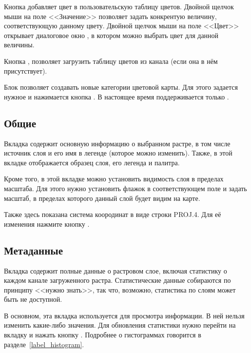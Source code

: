 Кнопка  добавляет цвет в пользовательскую таблицу
цветов. Двойной щелчок мыши на поле <<Значение>>
позволяет задать конкрентую величину, соответствующую данному цвету. Двойной щелчок
мыши на поле <<Цвет>> открывает диалоговое окно , в котором
можно выбрать цвет для данной величины.

Кнопка ,
позволяет загрузить таблицу цветов из канала (если она в нём присутствует).

Блок  позволяет создавать
новые категории цветовой карты. Для этого задается нужное
 и нажимается кнопка
. В настоящее время поддерживается только
.

\subsection{Общие}\label{label_generaltab}

Вкладка  содержит основную информацию о выбранном растре,
в том числе источник слоя и его имя в легенде (которое можно изменить).
Также, в этой вкладке отображается образец слоя, его легенда и палитра.

Кроме того, в этой вкладке можно установить видимость слоя в пределах
масштаба. Для этого нужно установить флажок в соответствующем поле и
задать масштаб, в пределах которого данный слой будет видим на
карте.

Также здесь показана система коородинат в виде строки PROJ.4. Для её изменения
нажмите кнопку .

\subsection{Метаданные}\label{label_metatab}

Вкладка  содержит полные данные о растровом слое,
включая статистику о каждом канале загруженного растра. Статистические
данные собираются по принципу <<нужно знать>>, так что, возможно,
статистика по слоям может быть не доступной.

В основном, эта вкладка используется для просмотра информации. В ней
нельзя изменить какие-либо значения. Для обновления статистики нужно
перейти на вкладку  и нажать кнопку .
Подробнее о гистограммах говорится в разделе~\ref{label_histogram}.

